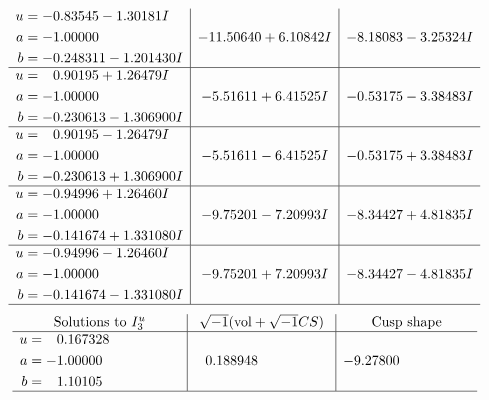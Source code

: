 \documentclass[1p]{elsarticle_modified}
\theoremstyle{definition}
\newcommand{\I}{\sqrt{-1}}
\begin{document}
$$\begin{array}{c|c|c}
\begin{aligned}
u &= -0.83545 - 1.30181 I \\
a &= -1.00000\phantom{ +0.000000I} \\
b &= -0.248311 - 1.201430 I\end{aligned}
 & -11.50640 + 6.10842 I & -8.18083 - 3.25324 I \\ \hline\begin{aligned}
u &= \phantom{-}0.90195 + 1.26479 I \\
a &= -1.00000\phantom{ +0.000000I} \\
b &= -0.230613 - 1.306900 I\end{aligned}
 & -5.51611 + 6.41525 I & -0.53175 - 3.38483 I \\ \hline\begin{aligned}
u &= \phantom{-}0.90195 - 1.26479 I \\
a &= -1.00000\phantom{ +0.000000I} \\
b &= -0.230613 + 1.306900 I\end{aligned}
 & -5.51611 - 6.41525 I & -0.53175 + 3.38483 I \\ \hline\begin{aligned}
u &= -0.94996 + 1.26460 I \\
a &= -1.00000\phantom{ +0.000000I} \\
b &= -0.141674 + 1.331080 I\end{aligned}
 & -9.75201 - 7.20993 I & -8.34427 + 4.81835 I \\ \hline\begin{aligned}
u &= -0.94996 - 1.26460 I \\
a &= -1.00000\phantom{ +0.000000I} \\
b &= -0.141674 - 1.331080 I\end{aligned}
 & -9.75201 + 7.20993 I & -8.34427 - 4.81835 I\\
 \hline 
 \end{array}$$\newpage$$\begin{array}{c|c|c}  
\text{Solutions to }I^u_{3}& \I (\text{vol} + \sqrt{-1}CS) & \text{Cusp shape}\\
 \hline 
\begin{aligned}
u &= \phantom{-}0.167328\phantom{ +0.000000I} \\
a &= -1.00000\phantom{ +0.000000I} \\
b &= \phantom{-}1.10105\phantom{ +0.000000I}\end{aligned}
 & \phantom{-}0.188948\phantom{ +0.000000I} & -9.27800\phantom{ +0.000000I}\\
 \hline 
 \end{array}$$\newpage\newpage\renewcommand{\arraystretch}{1}
\end{document}
